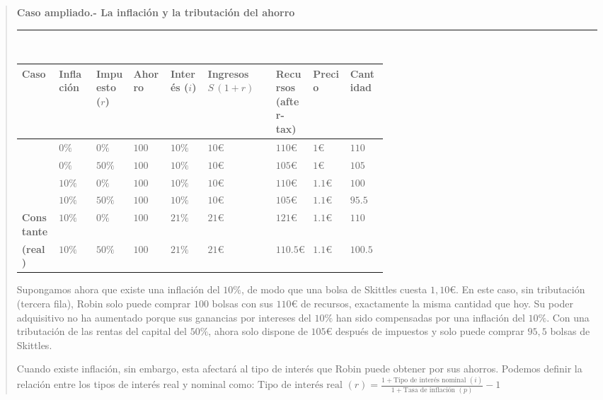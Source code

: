 \documentclass[10pt,a4paper]{article}
\newenvironment{specialblock}[1]{%
      \begin{quote} %
      \small %
      \noindent\textbf{#1}\\[-0.3em] %
      \rule{\linewidth}{0.4pt}\\[0.6em]}{
      \end{quote}}
\begin{document}
\begin{specialblock}{\textbf{Caso ampliado.-} La inflación y la tributación del ahorro}
    \begin{center}
    \begin{tabular}{p{0.07\linewidth}p{0.07\linewidth}p{0.07\linewidth}p{0.07\linewidth}p{0.07\linewidth}p{0.07\linewidth}p{0.07\linewidth}p{0.07\linewidth}p{0.07\linewidth}}
    \hline
      {\scriptsize\textbf{Caso}} & {\scriptsize\textbf{Inflación}} & {\scriptsize\textbf{Impuesto ($r$)}} & {\scriptsize\textbf{Ahorro}} & {\scriptsize\textbf{Interés ($i$)}} & {\scriptsize\textbf{Ingresos $S\,(1+r)$}} & {\scriptsize\textbf{Recursos (after-tax)}} & {\scriptsize\textbf{Precio}} & {\scriptsize\textbf{Cantidad}} \\
    \hline
      {\scriptsize\multirow{2}{*}{\textbf{Sin inflación}}} & $0\%$ & $0\%$ & $100$ & $10\%$ & $10€$ & $110€$ & $1€$ & $110$ \\
       & $0\%$ & $50\%$ & $100$ & $10\%$ & $10€$ & $105€$ & $1€$ & $105$ \\
       {\scriptsize\multirow{2}{*}{\textbf{Inflación}}} & $10\%$ & $0\%$ & $100$ & $10\%$ & $10€$ & $110€$ & $1.1€$ & $100$ \\
       & $10\%$ & $50\%$ & $100$ & $10\%$ & $10€$ & $105€$ & $1.1€$ & $95.5$\\
    {\scriptsize\textbf{Constante}} & $10\%$ & $0\%$ & $100$ & $21\%$ & $21€$ & $121€$ & $1.1€$ & $110$ \\
       {\scriptsize\textbf{(real)}}& $10\%$ & $50\%$ & $100$ & $21\%$ & $21€$ & $110.5€$ & $1.1€$ & $100.5$ \\
    \hline
    \end{tabular}
    \end{center}
    
    Supongamos ahora que existe una inflación del $10\%$, de modo que una bolsa de Skittles cuesta $1,10€$. En este caso, sin tributación (tercera fila), Robin solo puede comprar $100$ bolsas con sus $110€$ de recursos, exactamente la misma cantidad que hoy. Su poder adquisitivo no ha aumentado porque sus ganancias por intereses del $10\%$ han sido compensadas por una inflación del $10\%$. Con una tributación de las rentas del capital del $50\%$, ahora solo dispone de $105$€ después de impuestos y solo puede comprar $95,5$ bolsas de Skittles.
    
    Cuando existe inflación, sin embargo, esta afectará al tipo de interés que Robin puede obtener por sus ahorros. Podemos definir la relación entre los tipos de interés real y nominal como: $\text{Tipo de interés real }(r)=\frac{1+\text{Tipo de interés nominal }(i)}{1+\text{Tasa de inflación }(p)}-1$
    

\end{specialblock}
\end{document}
